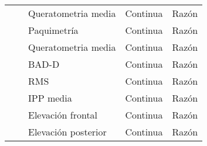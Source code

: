 \begin{landscape}
\begin{longtable}{p{4cm}p{6.5cm}p{5cm}p{3cm}p{2.5cm}}
    \cline{3-5}
    & & Queratometria media & Continua & Razón \\
    \cline{3-5}
    & & Paquimetría & Continua & Razón \\
    \cline{3-5}
    & & Queratometria media & Continua & Razón \\
    \cline{3-5}
    & & BAD-D & Continua & Razón \\
    \cline{3-5}
    & & RMS & Continua & Razón \\
    \cline{3-5}
    & & IPP media & Continua & Razón \\
    \cline{3-5}
    & & Elevación frontal & Continua & Razón \\
    \cline{3-5}
    & & Elevación posterior & Continua & Razón \\
    \hline
\end{longtable}

\end{landscape}




















